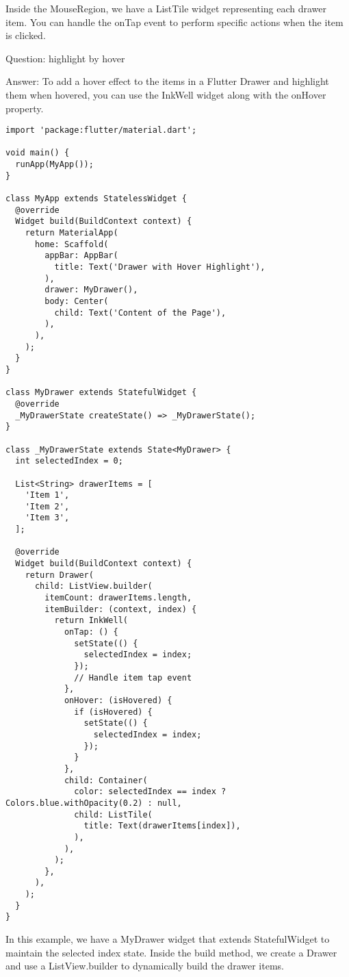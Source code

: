 Inside the MouseRegion, we have a ListTile widget representing each drawer item. You can handle the onTap event to 
perform specific actions when the item is clicked.

Question: highlight by hover

Answer: To add a hover effect to the items in a Flutter Drawer and highlight them when hovered, you can use the 
InkWell widget along with the onHover property.

\begin{lstlisting}
import 'package:flutter/material.dart';

void main() {
  runApp(MyApp());
}

class MyApp extends StatelessWidget {
  @override
  Widget build(BuildContext context) {
    return MaterialApp(
      home: Scaffold(
        appBar: AppBar(
          title: Text('Drawer with Hover Highlight'),
        ),
        drawer: MyDrawer(),
        body: Center(
          child: Text('Content of the Page'),
        ),
      ),
    );
  }
}

class MyDrawer extends StatefulWidget {
  @override
  _MyDrawerState createState() => _MyDrawerState();
}

class _MyDrawerState extends State<MyDrawer> {
  int selectedIndex = 0;

  List<String> drawerItems = [
    'Item 1',
    'Item 2',
    'Item 3',
  ];

  @override
  Widget build(BuildContext context) {
    return Drawer(
      child: ListView.builder(
        itemCount: drawerItems.length,
        itemBuilder: (context, index) {
          return InkWell(
            onTap: () {
              setState(() {
                selectedIndex = index;
              });
              // Handle item tap event
            },
            onHover: (isHovered) {
              if (isHovered) {
                setState(() {
                  selectedIndex = index;
                });
              }
            },
            child: Container(
              color: selectedIndex == index ? Colors.blue.withOpacity(0.2) : null,
              child: ListTile(
                title: Text(drawerItems[index]),
              ),
            ),
          );
        },
      ),
    );
  }
}
\end{lstlisting}

In this example, we have a MyDrawer widget that extends StatefulWidget to maintain the selected index state. Inside 
the build method, we create a Drawer and use a ListView.builder to dynamically build the drawer items.

